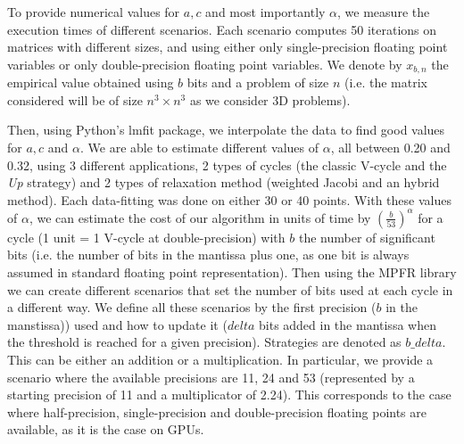    To provide numerical values for $a,c$ and most importantly $\alpha$, we measure the execution times of different scenarios. Each scenario computes 50 iterations on matrices with different sizes, and using
   either only single-precision floating point variables or only double-precision floating point variables. We denote by $x_{b,n}$ the empirical value obtained using $b$ bits and a problem of size $n$ (i.e. the matrix
   considered will be of size $n^3 \times n^3$ as we consider 3D problems). %
   
   Then, using Python's lmfit package, we interpolate the data to find good values for $a,c$ and $\alpha$. We are able to estimate different values of $\alpha$, all between 0.20 and 0.32, using 3
   different applications, 2 types of cycles (the classic V-cycle and the \emph{Up} strategy) and 2 types of relaxation method (weighted Jacobi and an hybrid method). Each data-fitting was done on either 30 or 40 points.
   With these values of $\alpha$, we can estimate the cost of our algorithm in units of time by $\left(\frac{b}{53}\right)^\alpha$ for a cycle (1 unit = 1 V-cycle at double-precision) with $b$ the number of significant
   bits (i.e. the number of bits in the mantissa plus one, as one bit is always assumed in standard floating point representation). Then using the MPFR library we can create different
   scenarios that set the number of bits used at each cycle in a different way. We define all these scenarios by the first precision ($b$ in the manstissa)) used and how to update it ($delta$ bits added in the mantissa when the threshold is reached for a given precision).
   Strategies are denoted as $b\_delta$.
   This can be either an addition or a multiplication. In particular, we provide a scenario where the available precisions are 11, 24 and 53 (represented by a starting precision of 11 and a multiplicator of 2.24). This
   corresponds to the case where half-precision, single-precision and double-precision floating points are available, as it is the case on GPUs.
   
